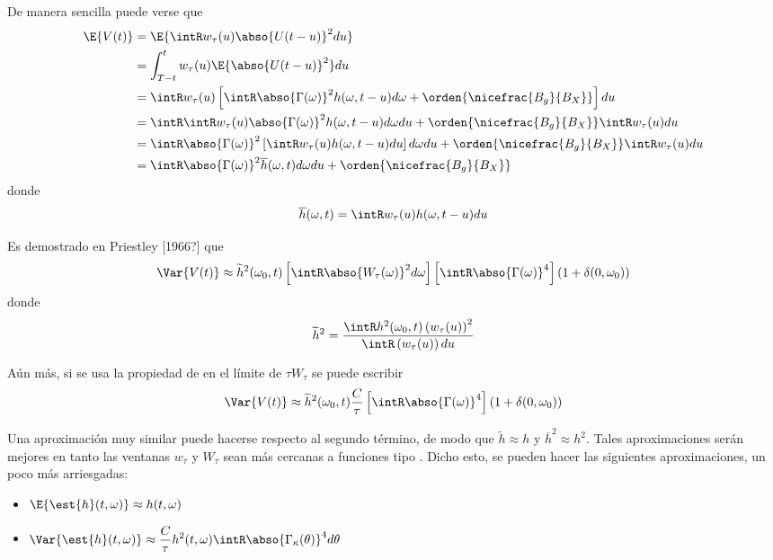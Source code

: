 De manera sencilla puede verse que
\begin{align*}
\E{V(t)} &= 
\E{\intR w_\tau (u) \abso{U(t-u)}^{2} du} \\
&= 
\int_{T-t}^{t} w_\tau (u) \E{\abso{U(t-u)}^{2}} du \\
&=
\intR w_\tau (u) \left[
\intR \abso{\Gamma(\omega)}^{2} h(\omega, t-u)d\omega + \orden{\nicefrac{B_g}{B_X}} \right] du \\
&=
\intR \intR w_\tau (u) \abso{\Gamma(\omega)}^{2} h(\omega, t-u)d\omega du +
\orden{\nicefrac{B_g}{B_X}} \intR w_\tau (u) du \\
&=
\intR \abso{\Gamma(\omega)}^{2} \left[ \intR w_\tau (u) h(\omega, t-u) du \right] d\omega du +
\orden{\nicefrac{B_g}{B_X}} \intR w_\tau (u) du \\
&=
\intR \abso{\Gamma(\omega)}^{2} \overline{h}(\omega,t) d\omega du +
\orden{\nicefrac{B_g}{B_X}} \\
\end{align*}
donde
\begin{equation}
\overline{h}(\omega,t) = \intR w_\tau (u) h(\omega, t-u) du
\end{equation}

Es demostrado en Priestley [1966?] que
\begin{equation}
\Var{V(t)} \approx \widetilde{h}^{2}(\omega_0,t) \left[ \intR \abso{W_\tau(\omega)}^{2} d\omega \right] \left[ \intR \abso{\Gamma(\omega)}^{4} \right] (1+\delta(0,\omega_0))
\end{equation}
donde
\begin{equation}
\widetilde{h}^{2} = \frac{\intR h^{2}(\omega_0,t) \left(w_\tau(u)\right)^{2}}{\intR \left(w_\tau(u)\right) du}
\end{equation}

Aún más, si se usa la propiedad de en el límite de $\tau W_\tau$ se puede escribir
\begin{equation}
\Var{V(t)} \approx 
\widetilde{h}^{2}(\omega_0,t) \frac{C}{\tau} \left[ \intR \abso{\Gamma(\omega)}^{4} \right] (1+\delta(0,\omega_0))
\end{equation}

Una aproximación muy similar 
puede hacerse respecto al segundo término, de modo que $\widetilde{h}\approx h$ y 
$\overline{h}^{2}\approx h^{2}$.
Tales aproximaciones serán mejores en tanto las ventanas $w_{\tau}$ y $W_{\tau}$ sean más 
cercanas a funciones tipo \dirac.
Dicho esto, se pueden hacer las siguientes aproximaciones, un poco más arriesgadas:
\begin{itemize}
\item $\displaystyle \E{\est{h}(t,\omega)} \approx h(t,\omega)$
\item $\displaystyle \Var{\est{h}(t,\omega)} \approx 
\frac{C}{\tau} h^{2}(t,\omega) \intR \abso{\Gamma_\kappa (\theta)}^{4} d\theta$
\end{itemize}

